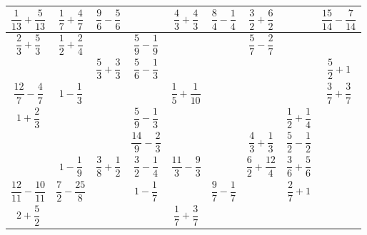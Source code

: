   \begin{center}
   {
   \footnotesize
      \begin{tabular}{|*{3}{C{0.9}|}|*{3}{C{0.9}|}|*{3}{C{0.9}|}}
         \hline
          \!$\dfrac1{13}+\dfrac5{13}$\! & $\dfrac17+\dfrac47$ & $\dfrac96-\dfrac56$ & & $\dfrac43+\dfrac43$ & $\dfrac84-\dfrac14$ & $\dfrac32+\dfrac62$ & & \!$\dfrac{15}{14}-\dfrac{7}{14}\!$ \\
         \hline
          $\dfrac23+\dfrac53$ & $\dfrac12+\dfrac24$ & & $\dfrac59-\dfrac19$ & & & $\dfrac57-\dfrac27$ & & \\
         \hline
          & & $\dfrac53+\dfrac33$ & $\dfrac56-\dfrac13$ & & & & & $\dfrac52+1$\\
          \hline
          \hline
          $\dfrac{12}7-\dfrac47$ & $1-\dfrac13$ & & & $\dfrac15+\dfrac{1}{10}$ & & & & $\dfrac37+\dfrac37$ \\
         \hline
          $1+\dfrac23$ & & & $\dfrac59-\dfrac13$ & & & & $\dfrac12+\dfrac14$ & \\
         \hline
          & & & $\dfrac{14}{9}-\dfrac23$ & & & $\dfrac43+\dfrac13$ & $\dfrac52-\dfrac12$ & \\
         \hline
         \hline
          & $1-\dfrac19$ & $\dfrac38+\dfrac12$ & $\dfrac32-\dfrac14$ & $\dfrac{11}3-\dfrac93$ & & $\dfrac62+\dfrac{12}4$ & $\dfrac36+\dfrac56$ & \\
         \hline
          \!$\dfrac{12}{11}-\dfrac{10}{11}$\! & $\dfrac72-\dfrac{25}{8}$ &  & $1-\dfrac17$ & & $\dfrac97-\dfrac17$ & & $\dfrac27+1$ & \\
         \hline
          $2+\dfrac52$ & & & & $\dfrac17+\dfrac37$ & & & & \\
         \hline
      \end{tabular}}
   \end{center}

